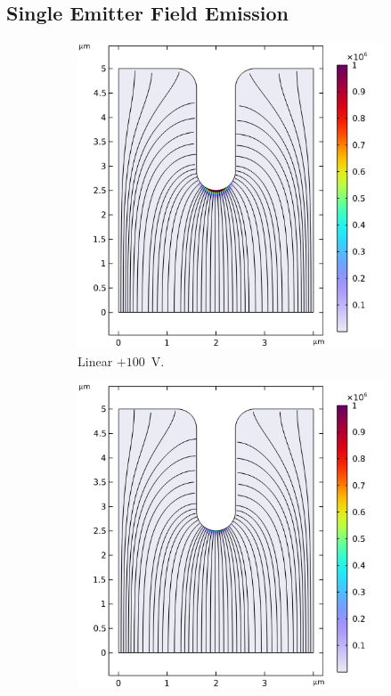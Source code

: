\begin{refsection}
\subsection{Single Emitter Field Emission}
\begin{figure}[H]
    \centering
    \begin{subfigure}[b]{0.45\linewidth}
        \includegraphics[width=\linewidth]{Chapter7/Figs/Raster/Comsol/+100_J_GM_smol.png}
        \caption{Linear $+100$~\si{\volt}.}
        \label{fig:c_+100_j_gm}
    \end{subfigure}
    \hfill %
    \begin{subfigure}[b]{0.45\linewidth}
        \includegraphics[width=\linewidth]{Chapter7/Figs/Raster/Comsol/-100_J_GM_smol.png}

\end{subfigure}
\end{figure}
\end{refsection}
